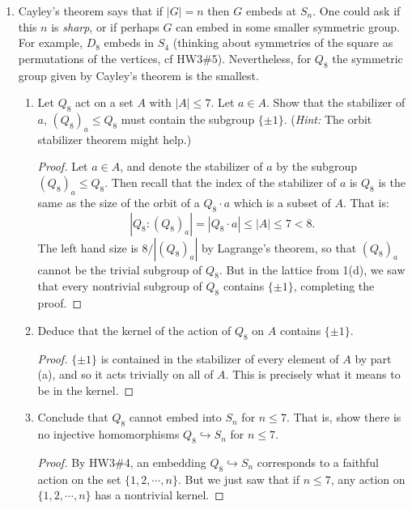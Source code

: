 \documentclass[11pt]{article}
\begin{document}
\begin{enumerate}
\begin{enumerate}
\begin{proof}
      Thus $\sigma_i$ is even.
    \end{proof}
    \item $A_8\cap H$ is isomorphic to a subgroup of $Q_8$.  Which one?
    \begin{proof}
      As in part (c) one can easily compute that $\sigma_j$ is even as well, so that the entire subgroup they generate is contained in $A_8$.  Thus $A_8\cap H = H \cong Q_8$.
    \end{proof}
  \end{enumerate}
  \item Cayley's theorem says that if $|G|=n$ then $G$ embeds at $S_n$.  One could ask if this $n$ is \textit{sharp}, or if perhaps $G$ can embed in some smaller symmetric group.  For example, $D_8$ embeds in $S_4$ (thinking about symmetries of the square as permutations of the vertices, cf HW3\#5).  Nevertheless, for $Q_8$ the symmetric group given by Cayley's theorem is the smallest.
  \begin{enumerate}
    \item Let $Q_8$ act on a set $A$ with $|A|\le 7$.  Let $a\in A$.  Show that the stabilizer of $a$,  $(Q_8)_a\le Q_8$ must contain the subgroup $\{\pm1\}$.  (\textit{Hint:} The orbit stabilizer theorem might help.)
    \begin{proof}
      Let $a\in A$, and denote the stabilizer of $a$ by the subgroup $(Q_8)_a\le Q_8$.  Then recall that the index of the stabilizer of $a$ is $Q_8$ is the same as the size of the orbit of a $Q_8\cdot a$ which is a subset of $A$.  That is:
      \[|Q_8:(Q_8)_a| = |Q_8\cdot a|\le |A|\le 7<8.\]
      The left hand size is $8/|(Q_8)_a|$ by Lagrange's theorem, so that $(Q_8)_a$ cannot be the trivial subgroup of $Q_8$.  But in the lattice from 1(d), we saw that every nontrivial subgroup of $Q_8$ contains $\{\pm1\}$, completing the proof.
    \end{proof}
    \item Deduce that the kernel of the action of $Q_8$ on $A$ contains $\{\pm1\}$.
    \begin{proof}
      $\{\pm1\}$ is contained in the stabilizer of every element of $A$ by part (a), and so it acts trivially on all of $A$.  This is precisely what it means to be in the kernel.
    \end{proof}
    \item Conclude that $Q_8$ cannot embed into $S_n$ for $n\le7$.  That is, show there is no injective homomorphisms $Q_8\hookrightarrow S_n$ for $n\le7$.
    \begin{proof}
      By HW3\#4, an embedding $Q_8\hookrightarrow S_n$ corresponds to a faithful action on the set $\{1,2,\cdots,n\}$.  But we just saw that if $n\le 7$, any action on $\{1,2,\cdots,n\}$ has a nontrivial kernel.
    \end{proof}
  \end{enumerate}
\end{enumerate}
\end{document}
